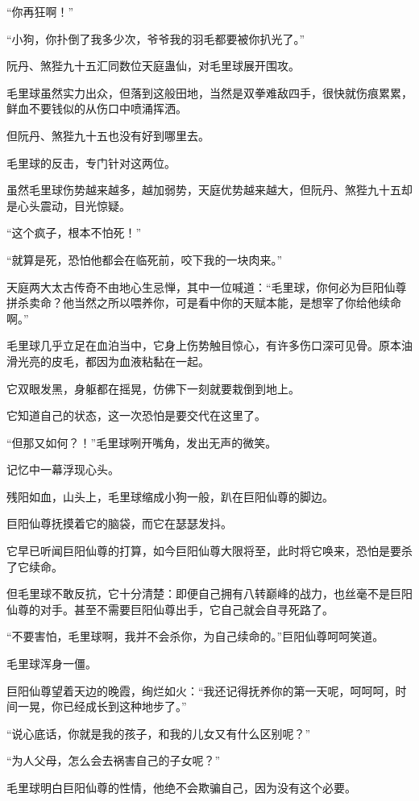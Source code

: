 \begin{this_body}
“你再狂啊！”

“小狗，你扑倒了我多少次，爷爷我的羽毛都要被你扒光了。”

阮丹、煞狴九十五汇同数位天庭蛊仙，对毛里球展开围攻。

毛里球虽然实力出众，但落到这般田地，当然是双拳难敌四手，很快就伤痕累累，鲜血不要钱似的从伤口中喷涌挥洒。

但阮丹、煞狴九十五也没有好到哪里去。

毛里球的反击，专门针对这两位。

虽然毛里球伤势越来越多，越加弱势，天庭优势越来越大，但阮丹、煞狴九十五却是心头震动，目光惊疑。

“这个疯子，根本不怕死！”

“就算是死，恐怕他都会在临死前，咬下我的一块肉来。”

天庭两大太古传奇不由地心生忌惮，其中一位喊道：“毛里球，你何必为巨阳仙尊拼杀卖命？他当然之所以喂养你，可是看中你的天赋本能，是想宰了你给他续命啊。”

毛里球几乎立足在血泊当中，它身上伤势触目惊心，有许多伤口深可见骨。原本油滑光亮的皮毛，都因为血液粘黏在一起。

它双眼发黑，身躯都在摇晃，仿佛下一刻就要栽倒到地上。

它知道自己的状态，这一次恐怕是要交代在这里了。

“但那又如何？！”毛里球咧开嘴角，发出无声的微笑。

记忆中一幕浮现心头。

残阳如血，山头上，毛里球缩成小狗一般，趴在巨阳仙尊的脚边。

巨阳仙尊抚摸着它的脑袋，而它在瑟瑟发抖。

它早已听闻巨阳仙尊的打算，如今巨阳仙尊大限将至，此时将它唤来，恐怕是要杀了它续命。

但毛里球不敢反抗，它十分清楚：即便自己拥有八转巅峰的战力，也丝毫不是巨阳仙尊的对手。甚至不需要巨阳仙尊出手，它自己就会自寻死路了。

“不要害怕，毛里球啊，我并不会杀你，为自己续命的。”巨阳仙尊呵呵笑道。

毛里球浑身一僵。

巨阳仙尊望着天边的晚霞，绚烂如火：“我还记得抚养你的第一天呢，呵呵呵，时间一晃，你已经成长到这种地步了。”

“说心底话，你就是我的孩子，和我的儿女又有什么区别呢？”

“为人父母，怎么会去祸害自己的子女呢？”

毛里球明白巨阳仙尊的性情，他绝不会欺骗自己，因为没有这个必要。


\end{this_body}
